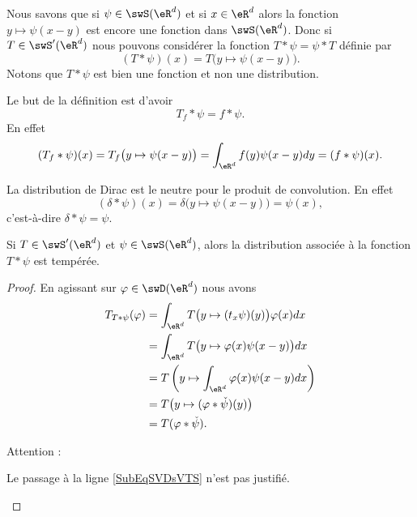 Nous savons que si \( \psi\in\swS(\eR^d)\) et si \( x\in\eR^d\) alors la fonction \( y\mapsto\psi(x-y)\) est encore une fonction dans \( \swS(\eR^d)\). Donc si \( T\in\swS'(\eR^d)\) nous pouvons considérer la fonction \( T*\psi=\psi*T\) définie par
\begin{equation}        \label{EQooOUXKooGHDSzL}
    (T*\psi)(x)=T\big( y\mapsto\psi(x-y) \big).
\end{equation}
Notons que \( T*\psi\) est bien une fonction et non une distribution.

Le but de la définition est d'avoir
\begin{equation}
    T_f*\psi=f*\psi.
\end{equation}
En effet
\begin{equation}
    (T_f*\psi)(x)=T_f\big( y\mapsto \psi(x-y) \big)=\int_{\eR^d}f(y)\psi(x-y)dy=(f*\psi)(x).
\end{equation}

\begin{example}
    La distribution de Dirac est le neutre pour le produit de convolution. En effet
    \begin{equation}
        (\delta*\psi)(x)=\delta\big( y\mapsto\psi(x-y) \big)=\psi(x),
    \end{equation}
    c'est-à-dire \( \delta*\psi=\psi\).
\end{example}

\begin{proposition} \label{PropZMKYMKI}
    Si \( T\in\swS'(\eR^d)\) et \( \psi\in\swS(\eR^d)\), alors la distribution associée à la fonction \( T*\psi\) est tempérée.
\end{proposition}

\begin{proof}
    En agissant sur \( \varphi\in\swD(\eR^d)\) nous avons
    \begin{subequations}
        \begin{align}
            T_{T*\psi}(\varphi)&=\int_{\eR^d}T\big( y\mapsto (t_x\psi)(y) \big)\varphi(x)dx\\
            &=\int_{\eR^d}T\big( y\mapsto \varphi(x)\psi(x-y) \big)dx\\
            &=T\left( y\mapsto\int_{\eR^d}\varphi(x)\psi(x-y)dx \right)     \label{SubEqSVDsVTS}\\
            &=T\big(y\mapsto (\varphi*\check\psi)(y)\big)\\
            &=T(\varphi*\check\psi).
        \end{align}
    \end{subequations}

    Attention :
    \begin{probleme}
        Le passage à la ligne \eqref{SubEqSVDsVTS} n'est pas justifié.
    \end{probleme}
\end{proof}


